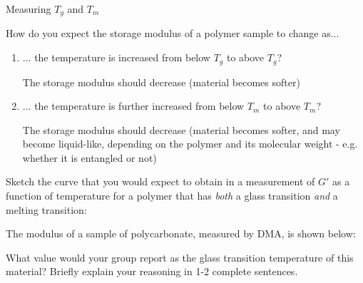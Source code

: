 \begin{activity}{Measuring $T_g$ and $T_m$}
\begin{ctqs}

	\question How do you expect the storage modulus of a polymer sample to change as...
	
		\begin{enumerate}
			\item ... the temperature is increased from below $T_g$ to above $T_g$?
			
				\begin{solution}[0.75in]
					The storage modulus should decrease (material becomes softer)
				\end{solution}
			
			\item ... the temperature is further increased from below $T_m$ to above $T_m$?
			
				\begin{solution}[0.75in]
					The storage modulus should decrease (material becomes softer, and may become liquid-like, depending on the polymer and its molecular weight - e.g. whether it is entangled or not)
				\end{solution}
		
		\end{enumerate}
		
	\question Sketch the curve that you would expect to obtain in a measurement of $G'$ as a function of temperature for a polymer that has \emph{both} a glass transition \emph{and} a melting transition:
	
		\vspace{6pt}
		\begin{solution}[2.5in]\end{solution}
		
	
	\clearpage
	\question The modulus of a sample of polycarbonate, measured by DMA, is shown below:
	
		\vspace{6pt}
		\begin{solution}[2.5in]\end{solution}
		
		What value would your group report as the glass transition temperature of this material?  Briefly explain your reasoning in 1-2 complete sentences.
		

\end{ctqs}
\end{activity}
